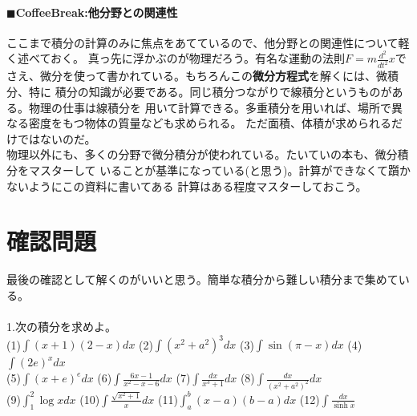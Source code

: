 \documentclass[a4j,dvipdfmx]{jsarticle}
\begin{document}
\subsection*{$\blacksquare$CoffeeBreak:他分野との関連性}
\begin{screen}
    ここまで積分の計算のみに焦点をあてているので、他分野との関連性について軽く述べておく。
    真っ先に浮かぶのが物理だろう。有名な運動の法則$\displaystyle F=m\frac{d^2}{dt^2}x$で
    さえ、微分を使って書かれている。もちろんこの\textbf{微分方程式}を解くには、微積分、特に
    積分の知識が必要である。同じ積分つながりで線積分というものがある。物理の仕事は線積分を
    用いて計算できる。多重積分を用いれば、場所で異なる密度をもつ物体の質量なども求められる。
    ただ面積、体積が求められるだけではないのだ。\\
    物理以外にも、多くの分野で微分積分が使われている。たいていの本も、微分積分をマスターして
    いることが基準になっている(と思う)。計算ができなくて躓かないようにこの資料に書いてある
    計算はある程度マスターしておこう。
\end{screen}
\newpage
\part{確認問題}
最後の確認として解くのがいいと思う。簡単な積分から難しい積分まで集めている。\\
\hrulefill\\
1.次の積分を求めよ。\\

(1)$\displaystyle \int(x+1)(2-x)dx$
\hspace{10mm}
(2)$\displaystyle \int(x^2+a^2)^3dx$
\hspace{10mm}
(3)$\displaystyle \int\sin(\pi-x)dx$
\hspace{10mm}
(4)$\displaystyle \int (2e)^{x}dx$\\

(5)$\displaystyle \int(x+e)^e dx$
\hspace{19mm}
(6)$\displaystyle \int\frac{6x-1}{x^2-x-6}dx$
\hspace{9mm}
(7)$\displaystyle \int \frac{dx}{x^3+1}dx$
\hspace{15mm}
(8)$\displaystyle \int\frac{dx}{(x^2+a^2)^2}dx$\\

(9)$\displaystyle \int_1^2\log x dx$
\hspace{22mm}
(10)$\displaystyle \int\frac{\sqrt{x^2+1}}{x}dx$
\hspace{10mm}
(11)$\displaystyle \int_a^b(x-a)(b-a)dx$
\hspace{1mm}
(12)$\displaystyle \int\frac{dx}{\sinh x}$\\
\end{document}
